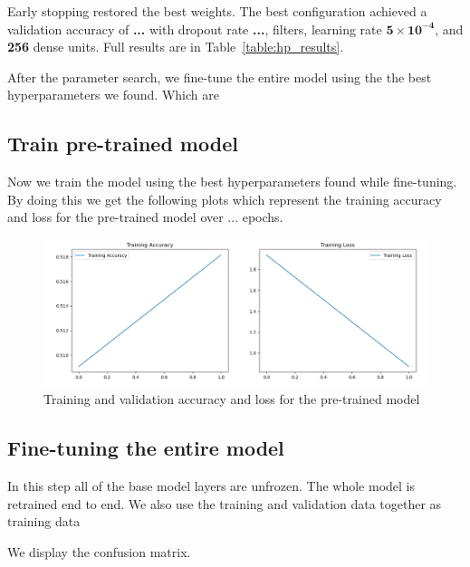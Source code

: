 \documentclass[conference]{IEEEtran}
\begin{document}
Early stopping restored the best weights. The best configuration achieved a validation accuracy of \textbf{...} with dropout rate \textbf{...}, \textbf{} filters, learning rate \(\mathbf{5\times10^{-4}}\), and \textbf{256} dense units. Full results are in Table~\ref{table:hp_results}.


After the parameter search, we fine-tune the entire model using the the best hyperparameters we found. Which are

\subsection{Train pre-trained model}
Now we train the model using the best hyperparameters found while fine-tuning.
By doing this we get the following plots which represent the training accuracy and loss for the pre-trained model over ... epochs.

\begin{figure}[htbp]
	\centerline{\includegraphics[width=\linewidth]{Images/Transferlearning_2.png}}
	\caption{Training and validation accuracy and loss for the pre-trained model}
	\label{fig:baseline_curves}
\end{figure}

\subsection{Fine-tuning the entire model}
In this step all of the base model layers are unfrozen. The whole model is retrained end to end. We also use the training and validation data together as training data

We display the confusion matrix.
\end{document}

